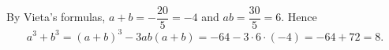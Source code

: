 By Vieta's formulas, $a+b=-\dfrac{20}{5}=-4$ and $ab=\dfrac{30}{5}=6$. Hence
\[a^3+b^3=(a+b)^3-3ab(a+b)=-64-3\cdot6\cdot(-4)=-64+72=\boxed{8}.\]
